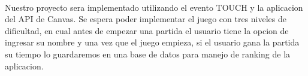 \documentclass[../documentacion_buscaminas2013.tex]{subfiles}
\begin{document}
\paragraph{ }
Nuestro proyecto sera implementado utilizando el evento TOUCH y la aplicacion del API de Canvas. Se espera poder implementar el juego con tres niveles de dificultad, en cual antes de empezar una partida el usuario tiene la opcion de ingresar su nombre y una vez que el juego empieza, si el usuario gana la partida su tiempo lo guardaremos en una base de datos para manejo de ranking de la aplicacion.

\clearpage
\end{document}
